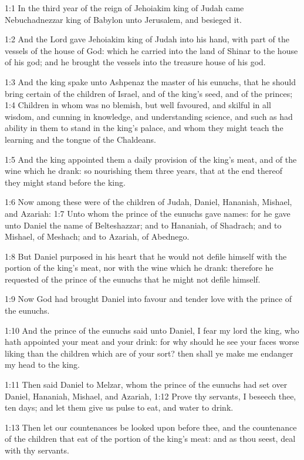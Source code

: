 

1:1 In the third year of the reign of Jehoiakim king of Judah came
Nebuchadnezzar king of Babylon unto Jerusalem, and besieged it.

1:2 And the Lord gave Jehoiakim king of Judah into his hand, with part
of the vessels of the house of God: which he carried into the land of
Shinar to the house of his god; and he brought the vessels into the
treasure house of his god.

1:3 And the king spake unto Ashpenaz the master of his eunuchs, that
he should bring certain of the children of Israel, and of the king's
seed, and of the princes; 1:4 Children in whom was no blemish, but
well favoured, and skilful in all wisdom, and cunning in knowledge,
and understanding science, and such as had ability in them to stand in
the king's palace, and whom they might teach the learning and the
tongue of the Chaldeans.

1:5 And the king appointed them a daily provision of the king's meat,
and of the wine which he drank: so nourishing them three years, that
at the end thereof they might stand before the king.

1:6 Now among these were of the children of Judah, Daniel, Hananiah,
Mishael, and Azariah: 1:7 Unto whom the prince of the eunuchs gave
names: for he gave unto Daniel the name of Belteshazzar; and to
Hananiah, of Shadrach; and to Mishael, of Meshach; and to Azariah, of
Abednego.

1:8 But Daniel purposed in his heart that he would not defile himself
with the portion of the king's meat, nor with the wine which he drank:
therefore he requested of the prince of the eunuchs that he might not
defile himself.

1:9 Now God had brought Daniel into favour and tender love with the
prince of the eunuchs.

1:10 And the prince of the eunuchs said unto Daniel, I fear my lord
the king, who hath appointed your meat and your drink: for why should
he see your faces worse liking than the children which are of your
sort? then shall ye make me endanger my head to the king.

1:11 Then said Daniel to Melzar, whom the prince of the eunuchs had
set over Daniel, Hananiah, Mishael, and Azariah, 1:12 Prove thy
servants, I beseech thee, ten days; and let them give us pulse to eat,
and water to drink.

1:13 Then let our countenances be looked upon before thee, and the
countenance of the children that eat of the portion of the king's
meat: and as thou seest, deal with thy servants.

